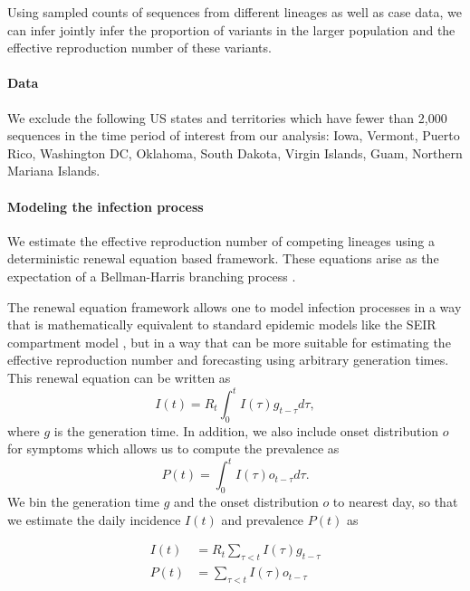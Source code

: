 \documentclass[11pt,oneside,letterpaper]{article}
\begin{document}
Using sampled counts of sequences from different lineages as well as case data, we can infer jointly infer the proportion of variants in the larger population and the effective reproduction number of these variants.

\paragraph{Data}

We exclude the following US states and territories which have fewer than 2,000 sequences in the time period of interest from our analysis: Iowa, Vermont, Puerto Rico, Washington DC, Oklahoma, South Dakota, Virgin Islands, Guam, Northern Mariana Islands.

\paragraph{Modeling the infection process}%

We estimate the effective reproduction number of competing lineages using a deterministic renewal equation based framework. These equations arise as the expectation of a Bellman-Harris branching process \cite{Bellman1948}. %

The renewal equation framework allows one to model infection processes in a way that is mathematically equivalent to standard epidemic models like the SEIR compartment model \cite{Champredon2018}, but in a way that can be more suitable for estimating the effective reproduction number and forecasting using arbitrary generation times. This renewal equation can be written as
\begin{equation}
  I(t) = R_{t} \int_{0}^{t} I(\tau)g_{t-\tau} d\tau,
\end{equation}
where $g$ is the generation time.
In addition, we also include onset distribution $o$ for symptoms which allows us to compute the prevalence as
\begin{equation}
  P(t) = \int_{0}^{t} I(\tau) o_{t-\tau} d \tau.
\end{equation}
We bin the generation time $g$ and the onset distribution $o$ to nearest day, so that we estimate the daily incidence $I(t)$ and prevalence $P(t)$ as

\begin{align}
  I(t) &= R_{t} \sum_{\tau < t} I(\tau) g_{t-\tau}\\
  P(t) &= \sum_{\tau < t} I(\tau) o_{t-\tau}
\end{align}
\end{document}
